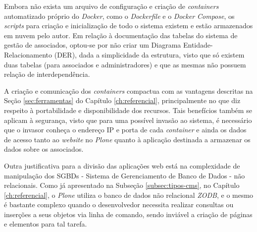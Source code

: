 Embora não exista um arquivo de configuração e criação de \textit{containers} automatizado próprio do \textit{Docker}, como o \textit{Dockerfile} e o \textit{Docker Compose}, os \textit{scripts} para criação e inicialização de todo o sistema existem e estão armazenados em nuvem pelo autor. Em relação à documentação das tabelas do sistema de gestão de associados, optou-se por não criar um Diagrama Entidade-Relacionamento (DER), dada a simplicidade da estrutura, visto que só existem duas tabelas (para associados e administradores) e que as mesmas não possuem relação de interdependência.

A criação e comunicação dos \textit{containers} compactua com as vantagens descritas na Seção \ref{sec:ferramentas} do Capítulo \ref{ch:referencial}, principalmente no que diz respeito à portabilidade e disponibilidade dos recursos. Tais benefícios também se aplicam à segurança, visto que para uma possível invasão ao sistema, é necessário que o invasor conheça o endereço IP e porta de cada \textit{container} e ainda os dados de acesso tanto ao \textit{website} no \textit{Plone} quanto à aplicação destinada a armazenar os dados sobre os associados.   

Outra justificativa para a divisão das aplicações web está na complexidade de manipulação dos SGBDs - Sistema de Gerenciamento de Banco de Dados - não relacionais. Como já apresentado na Subseção \ref{subsec:tipos-cms}, no Capítulo \ref{ch:referencial}, o \textit{Plone} utiliza o banco de dados não relacional \textit{ZODB}, e o mesmo é bastante complexo quando o desenvolvedor necessita realizar consultas ou inserções a seus objetos via linha de comando, sendo inviável a criação de páginas e elementos para tal tarefa.  


